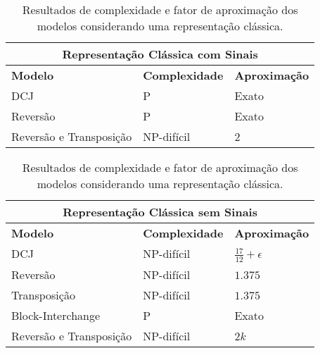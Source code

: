 \begin{table}[!htb]
  \caption{Resultados de complexidade e fator de aproximação dos modelos considerando uma representação clássica.}
  \label{table:XZPFGPAM}
  \centering
  \begin{tabular}{|p{8cm}|p{3cm}|p{3cm}|}
    \hline
    \multicolumn{3}{|c|}{\textbf{Representação Clássica com Sinais}}                                                             \\ \hline
    {\bf Modelo}                  & {\bf Complexidade}                                 & {\bf Aproximação}                       \\ \hline
    DCJ                     & P~\cite{2005-yancopoulos-etal}               & Exato~\cite{2005-yancopoulos-etal}                  \\ \hline
    Reversão                & P~\cite{1999-hannenhalli-pevzner}            & Exato~\cite{1999-hannenhalli-pevzner}               \\ \hline
    Reversão e Transposição & NP-difícil~\cite{2019b-oliveira-etal}        & $2$~\cite{1998-walter-etal}                         \\ \hline
  \end{tabular}

  \hfill \break

  \begin{tabular}{|p{8cm}|p{3cm}|p{3cm}|}
    \hline
    \multicolumn{3}{|c|}{\textbf{Representação Clássica sem Sinais}}                                                             \\ \hline
    {\bf Modelo}                  & {\bf Complexidade}                                 & {\bf Aproximação}                       \\ \hline
    DCJ                     & NP-difícil~\cite{2013-chen}                  & $\frac{17}{12}+\epsilon$~\cite{2013-chen}           \\ \hline
    Reversão                & NP-difícil~\cite{1999-caprara}               & $1.375$~\cite{2002-berman-etal}                     \\ \hline
    Transposição            & NP-difícil~\cite{2012-bulteau-etal}          & $1.375$~\cite{2006-elias-hartman,2022-silva-etal}   \\ \hline
    Block-Interchange       & P~\cite{1996-christie}                       & Exato~\cite{1996-christie}                          \\ \hline
    Reversão e Transposição & NP-difícil~\cite{2019b-oliveira-etal}        & $2k$~\cite{2008-rahman-etal,2013-chen}              \\ \hline
  \end{tabular}
\end{table}